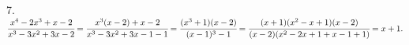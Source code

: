 7. $\cfrac{x^4-2x^3+x-2}{x^3-3x^2+3x-2}=\cfrac{x^3(x-2)+x-2}{x^3-3x^2+3x-1-1}=\cfrac{(x^3+1)(x-2)}{(x-1)^3-1}=
\cfrac{(x+1)(x^2-x+1)(x-2)}{(x-2)(x^2-2x+1+x-1+1)}=x+1.$\\

